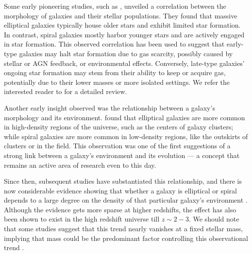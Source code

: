 Some early pioneering studies, such as \citet{holmberg_58}, unveiled a correlation between the morphology of galaxies and their stellar populations. They found that massive elliptical galaxies typically house older stars and exhibit limited star formation. In contrast, spiral galaxies mostly harbor younger stars and are actively engaged in star formation. This observed correlation has been used to suggest that early-type galaxies may halt star formation due to gas scarcity, possibly caused by  stellar or AGN feedback, or environmental effects. Conversely, late-type galaxies' ongoing star formation may stem from their ability to keep or acquire gas, potentially due to their lower masses or more isolated settings. We refer the interested reader to \citet{morph_review} for a detailed review.

Another early insight observed was the relationship between a galaxy's morphology and its environment. \citet{dressler_84} found that elliptical galaxies are more common in high-density regions of the universe, such as the centers of galaxy clusters; while spiral galaxies are more common in low-density regions, like the outskirts of clusters or in the field. This observation was one of the first suggestions of a strong link between a galaxy's environment and its evolution --- a concept that remains an active area of research even to this day.  

Since then, subsequent studies have substantiated this relationship, and there is now considerable evidence showing that whether a galaxy is elliptical or spiral depends to a large degree on the density of that particular galaxy's environment \citep[e.g.,][]{gomez_03, vdw08, blanton_09, Tasca09, Cappelari11, Fogarty14, hsc_morph_den}. Although the evidence gets more sparse at higher redshifts, the effect has also been shown to exist in the high redshift universe till $z\sim2-3$. We should note that some studies suggest that this trend nearly vanishes at a fixed stellar mass, implying that mass could be the predominant factor controlling this observational trend \citep[e.g.,][]{Holden07, Bamford09, Brough17, Greene17}.

